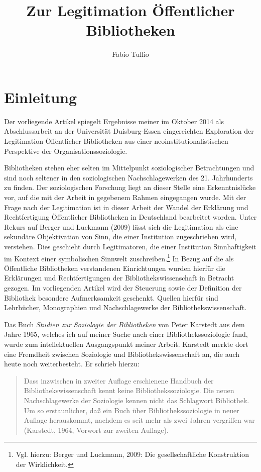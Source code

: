 \documentclass[a4paper,
fontsize=11pt,
oneside,
numbers=noperiodatend,
parskip=half-,
bibliography=totoc,
final
]{scrartcl}
\title{\LARGE{Zur Legitimation Öffentlicher Bibliotheken}} %
\author{Fabio Tullio} %
\date{}
\begin{document}
\maketitle
\thispagestyle{fancyplain} 


\section*{Einleitung}\label{einleitung}

Der vorliegende Artikel spiegelt Ergebnisse meiner im Oktober 2014 als
Abschlussarbeit an der Universität Duisburg-Essen eingereichten
Exploration der Legitimation Öffentlicher Bibliotheken aus einer
neoinstitutionalistischen Perspektive der Organisationssoziologie.

Bibliotheken stehen eher selten im Mittelpunkt soziologischer
Betrachtungen und sind noch seltener in den soziologischen
Nachschlagewerken des 21. Jahrhunderts zu finden. Der soziologischen
Forschung liegt an dieser Stelle eine Erkenntnislücke vor, auf die mit
der Arbeit in gegebenem Rahmen eingegangen wurde. Mit der Frage nach der
Legitimation ist in dieser Arbeit der Wandel der Erklärung und
Rechtfertigung Öffentlicher Bibliotheken in Deutschland bearbeitet
worden. Unter Rekurs auf Berger und Luckmann (2009) lässt sich die
Legitimation als eine sekundäre Objektivation von Sinn, die einer
Institution zugeschrieben wird, verstehen. Dies geschieht durch
Legitimatoren, die einer Institution Sinnhaftigkeit im Kontext einer
symbolischen Sinnwelt zuschreiben.\footnote{Vgl. hierzu: Berger und
  Luckmann, 2009: Die gesellschaftliche Konstruktion der Wirklichkeit.}
In Bezug auf die als Öffentliche Bibliotheken verstandenen Einrichtungen
wurden hierfür die Erklärungen und Rechtfertigungen der
Bibliothekswissenschaft in Betracht gezogen. Im vorliegenden Artikel
wird der Steuerung sowie der Definition der Bibliothek besondere
Aufmerksamkeit geschenkt. Quellen hierfür sind Lehrbücher, Monographien
und Nachschlagewerke der Bibliothekswissenschaft.

Das Buch \emph{Studien zur Soziologie der Bibliotheken} von Peter
Karstedt aus dem Jahre 1965, welches ich auf meiner Suche nach einer
Bibliothekssoziologie fand, wurde zum intellektuellen Ausgangspunkt
meiner Arbeit. Karstedt merkte dort eine Fremdheit zwischen Soziologie
und Bibliothekswissenschaft an, die auch heute noch weiterbesteht. Er
schrieb hierzu:

\begin{quote}
Dass inzwischen in zweiter Auflage erschienene Handbuch der
Bibliothekswissenschaft kennt keine Bibliothekssoziologie. Die neuen
Nachschlagewerke der Soziologie kennen nicht das Schlagwort Bibliothek.
Um so erstaunlicher, daß ein Buch über Bibliothekssoziologie in neuer
Auflage herauskommt, nachdem es seit mehr als zwei Jahren vergriffen war
(Karstedt, 1964, Vorwort zur zweiten Auflage).
\end{quote}
\end{document}
